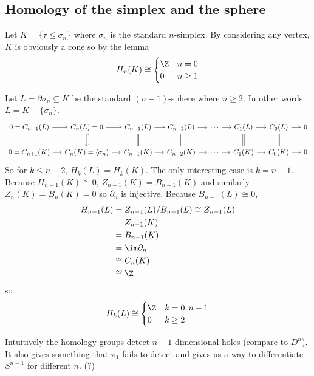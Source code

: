 \documentclass[a4paper]{article}
\renewcommand{\b}{\partial} %
\begin{document}
\subsection{Homology of the simplex and the sphere}

\begin{eg}
  Let \(K = \{\tau \leq \sigma_n\}\) where \(\sigma_n\) is the standard \(n\)-simplex. By considering any vertex, \(K\) is obviously a cone so by the lemma
  \[
    H_n(K) \cong
    \begin{cases}
      \Z & n = 0 \\
      0 & n \geq 1
    \end{cases}
  \]
\end{eg}

\begin{eg}
  Let \(L = \b \sigma_n \subseteq K\) be the standard \((n - 1)\)-sphere where \(n \geq 2\). In other words \(L = K - \{\sigma_n\}\).
  \[
    \begin{tikzcd}[column sep=small]
      0 = C_{n + 1}(L) \ar[r] & C_n(L) = 0 \ar[r] \ar[d, hookrightarrow] & C_{n -1}(L) \ar[r] \ar[d, equal] & C_{n - 2}(L) \ar[r] \ar[d, equal] & \cdots \ar[r] & C_1(L) \ar[r] \ar[d, equal] & C_0(L) \ar[r] \ar[d, equal] & 0 \\
      0 = C_{n + 1}(K) \ar[r] & C_n(K) = \langle \sigma_n \rangle \ar[r] & C_{n - 1}(K) \ar[r] & C_{n - 2}(K) \ar[r] & \cdots \ar[r] & C_1(K) \ar[r] & C_0(K) \ar[r] & 0
    \end{tikzcd}
  \]
  So for \(k \leq n - 2\), \(H_k(L) = H_k(K)\). The only interesting case is \(k = n - 1\). Because \(H_{n - 1}(K) \cong 0\), \(Z_{n - 1}(K) = B_{n - 1}(K)\) and similarly \(Z_n(K) = B_n(K) = 0\) so \(\b_n\) is injective. Because \(B_{n - 1}(L) \cong 0\),
  \begin{align*}
    H_{n - 1}(L)
    &= Z_{n - 1}(L) /B_{n - 1}(L) \cong Z_{n - 1}(L) \\
    &= Z_{n - 1}(K) \\
    &= B_{n - 1}(K) \\
    &= \im \b_n \\
    &\cong C_n(K) \\
    &\cong \Z
  \end{align*}
  so
  \[
    H_k(L) \cong
    \begin{cases}
      \Z & k = 0, n - 1 \\
      0 & k \geq 2
    \end{cases}
  \]
\end{eg}

Intuitively the homology groups detect \(n - 1\)-dimensional holes (compare to \(D^n\)). It also gives something that \(\pi_1\) fails to detect and gives us a way to differentiate \(S^{n - 1}\) for different \(n\). (?)
\end{document}
